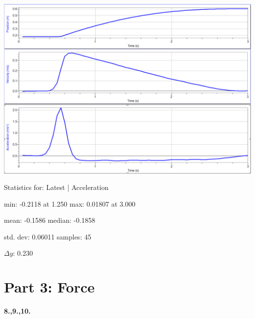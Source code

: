     \begin{mdframed}
        {\centering\includegraphics[width=\textwidth]{image13}}

        Statistics for: Latest | Acceleration

        min: -0.2118 at 1.250 max: 0.01807 at 3.000

        mean: -0.1586 median: -0.1858

        std. dev: 0.06011 samples: 45

        $\Delta y$: 0.230       
    \end{mdframed}

    \pagebreak

    \section*{Part 3: Force}

    \paragraph*{8.,9.,10.}

